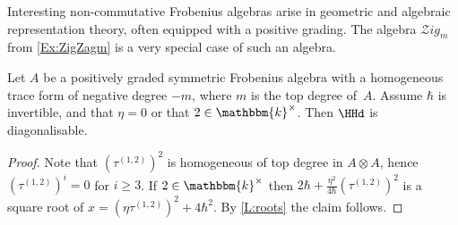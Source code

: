\documentclass[a4paper,11pt]{amsart}
\numberwithin{equation}{subsection}
\theoremstyle{definition}
\theoremstyle{theorem}
\theoremstyle{remark}
\newcommand\taui[1][i]{\tau^{(#1)}}
\newcommand\kk{\mathbbm{k}}
\begin{document}
Interesting non-commutative Frobenius algebras arise in
 geometric and algebraic representation theory, often equipped with a
 positive grading.  The algebra $\mathcal{Z}ig_m$ from  \autoref{Ex:ZigZagm}
 is a very special case of such an algebra.
\begin{Lemma}\label{P:diagbraided}
   Let  $A$ be a positively graded symmetric Frobenius algebra
   with a homogeneous trace form of negative degree $-m$, where $m$ is
   the top degree of~$A$. Assume $\hbar$ is invertible, and that $\eta=0$ or that $2\in\kk^\times$.  Then $\HHd$ is diagonalisable.
 \end{Lemma}
 \begin{proof} Note that $(\taui[1,2])^2$ is homogeneous of top degree in $A\otimes A$, hence $(\taui[1,2])^i=0$ for $i\geq 3$. If $2\in\kk^\times$ then
 ${2\hbar}+{\frac{\eta^{2}}{4\hbar}}(\taui[1,2])^2$ is a square root of $x= \left(\eta\taui[1,2]\right)^2+4\hbar^2$. By \autoref{L:roots}  the claim follows.
    \end{proof}
\end{document}
